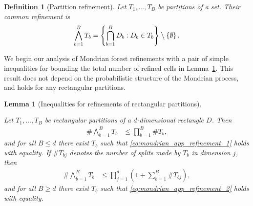 \documentclass[11pt,lof]{puthesis}
\newcommand{\bigsetminus}{\mathbin{\big\backslash}}
\theoremstyle{break}
\newtheorem{lemma}{Lemma}[section]
\newtheorem{definition}{Definition}[section]
\theoremstyle{proof}
\begin{document}
\begin{definition}[Partition refinement]%
%
Let $T_1, \ldots, T_B$ be partitions of a set.
Their common refinement is
%
\begin{align*}
\bigwedge_{b=1}^B T_b
= \left\{
\bigcap_{b=1}^B D_b:
D_b \in T_b
\right\}
\bigsetminus
\left\{ \emptyset \right\}.
\end{align*}
%
\end{definition}

We begin our analysis of Mondrian forest refinements with a pair of simple
inequalities for bounding the total number of refined cells
in Lemma~\ref{lem:mondrian_app_refinement_inequalities}. This result does not
depend
on the probabilistic structure of the Mondrian process, and holds for any
rectangular partitions.

\begin{lemma}[Inequalities for refinements of rectangular partitions]
\label{lem:mondrian_app_refinement_inequalities}

Let $T_1, \ldots, T_B$ be rectangular partitions of a $d$-dimensional
rectangle $D$. Then
%
\begin{align}
\label{eq:mondrian_app_refinement_1}
\# \bigwedge_{b=1}^B T_b
&\leq \prod_{b=1}^B \# T_b,
\end{align}
%
and for all $B \leq d$ there exist $T_b$ such that
\eqref{eq:mondrian_app_refinement_1} holds with equality.
If $\# T_{b j}$ denotes the number of splits
made by $T_b$ in dimension $j$, then
%
\begin{align}
\label{eq:mondrian_app_refinement_2}
\# \bigwedge_{b=1}^B T_b
&\leq \prod_{j=1}^d
\left( 1 + \sum_{b=1}^B \# T_{b j} \right),
\end{align}
%
and for all $B \geq d$ there exist $T_b$ such that
\eqref{eq:mondrian_app_refinement_2} holds with equality.

\end{lemma}
\end{document}

